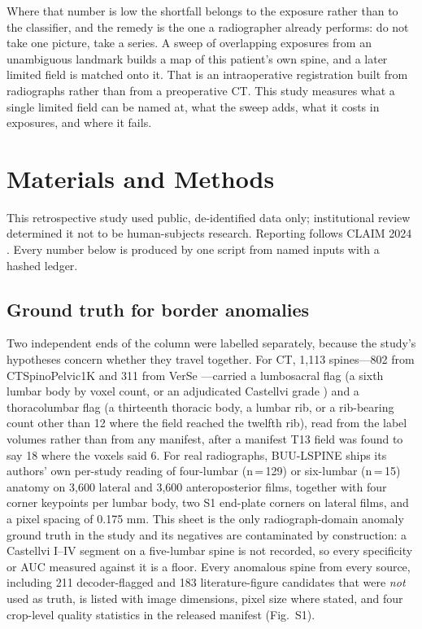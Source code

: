 \documentclass[11pt,letterpaper]{article}
\begin{document}
Where that number is low the shortfall belongs to the exposure rather than to the classifier, and the remedy
is the one a radiographer already performs: do not take one picture, take a series. A sweep of overlapping
exposures from an unambiguous landmark builds a map of this patient's own spine, and a later limited field is
matched onto it. That is an intraoperative registration built from radiographs rather than from a
preoperative CT. This study measures what a single limited field can be named at, what the sweep adds, what
it costs in exposures, and where it fails.


\section*{Materials and Methods}
This retrospective study used public, de-identified data only; institutional review determined it not to be human-subjects research. Reporting follows CLAIM 2024 \citep{claim2024}. Every number below is produced by one script from named inputs with a hashed ledger.

\subsection*{Ground truth for border anomalies}
Two independent ends of the column were labelled separately, because the study's hypotheses concern whether they travel together. For CT, 1,113 spines---802 from CTSpinoPelvic1K \citep{ctsp1k} and 311 from VerSe \citep{verse2021}---carried a lumbosacral flag (a sixth lumbar body by voxel count, or an adjudicated Castellvi grade \citep{castellvi1984}) and a thoracolumbar flag (a thirteenth thoracic body, a lumbar rib, or a rib-bearing count other than 12 where the field reached the twelfth rib), read from the label volumes rather than from any manifest, after a manifest T13 field was found to say 18 where the voxels said 6. For real radiographs, BUU-LSPINE \citep{buu2023} ships its authors' own per-study reading of four-lumbar (n\,=\,129) or six-lumbar (n\,=\,15) anatomy on 3,600 lateral and 3,600 anteroposterior films, together with four corner keypoints per lumbar body, two S1 end-plate corners on lateral films, and a pixel spacing of 0.175 mm. This sheet is the only radiograph-domain anomaly ground truth in the study and its negatives are contaminated by construction: a Castellvi I--IV segment on a five-lumbar spine is not recorded, so every specificity or AUC measured against it is a floor. Every anomalous spine from every source, including 211 decoder-flagged and 183 literature-figure candidates that were \emph{not} used as truth, is listed with image dimensions, pixel size where stated, and four crop-level quality statistics in the released manifest (Fig.~S1).
\end{document}
